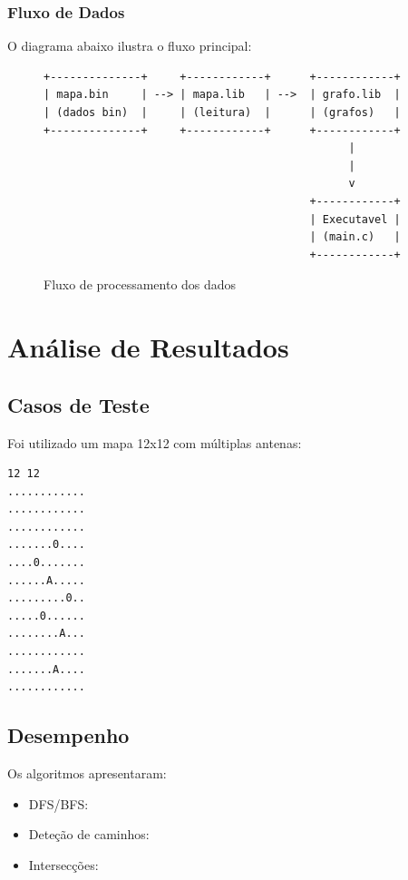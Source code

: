 \documentclass[a4paper,12pt]{report}
\begin{document}
\subsection{Fluxo de Dados}
O diagrama abaixo ilustra o fluxo principal:

\begin{figure}[H]
\centering
\begin{minipage}{0.9\textwidth}
\begin{lstlisting}[basicstyle=\ttfamily\footnotesize]
+--------------+     +------------+      +------------+  
| mapa.bin     | --> | mapa.lib   | -->  | grafo.lib  |
| (dados bin)  |     | (leitura)  |      | (grafos)   |
+--------------+     +------------+      +------------+ 
                                               |
                                               |
                                               v 
                                         +------------+
                                         | Executavel |
                                         | (main.c)   |
                                         +------------+

\end{lstlisting}
\end{minipage}
\caption{Fluxo de processamento dos dados}
\label{fig:dataflow}
\end{figure}

\chapter{Análise de Resultados}
\section{Casos de Teste}
Foi utilizado um mapa 12x12 com múltiplas antenas:

\begin{lstlisting}[basicstyle=\ttfamily\small]
12 12
............
............
............
.......0....
....0.......
......A.....
.........0..
.....0......
........A...
............
.......A....
............
\end{lstlisting}

\section{Desempenho}
Os algoritmos apresentaram:

\begin{itemize}
    \item DFS/BFS:
    \item Deteção de caminhos:
    \item Intersecções:
\end{itemize}
\end{document}
